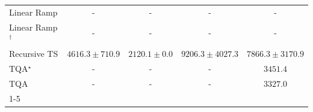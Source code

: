\begin{tabular}{l|cccc|}
Linear Ramp & {\cellcolor[HTML]{000000}} \color[HTML]{F1F1F1} {\cellcolor{white}} \color{black} - & {\cellcolor[HTML]{000000}} \color[HTML]{F1F1F1} {\cellcolor{white}} \color{black} - & {\cellcolor[HTML]{000000}} \color[HTML]{F1F1F1} {\cellcolor{white}} \color{black} - & {\cellcolor[HTML]{000000}} \color[HTML]{F1F1F1} {\cellcolor{white}} \color{black} - \\
Linear Ramp$^\dagger$ & {\cellcolor[HTML]{000000}} \color[HTML]{F1F1F1} {\cellcolor{white}} \color{black} - & {\cellcolor[HTML]{000000}} \color[HTML]{F1F1F1} {\cellcolor{white}} \color{black} - & {\cellcolor[HTML]{000000}} \color[HTML]{F1F1F1} {\cellcolor{white}} \color{black} - & {\cellcolor[HTML]{000000}} \color[HTML]{F1F1F1} {\cellcolor{white}} \color{black} - \\
Recursive TS & {\cellcolor[HTML]{9EBAD9}} \color[HTML]{000000} $4616.3\pm 710.9$ & {\cellcolor[HTML]{F5EEF6}} \color[HTML]{000000} $2120.1\pm 0.0$ & {\cellcolor[HTML]{023858}} \color[HTML]{F1F1F1} $9206.3\pm 4027.3$ & {\cellcolor[HTML]{04639B}} \color[HTML]{F1F1F1} $7866.3\pm 3170.9$ \\
TQA$^\star$ & {\cellcolor[HTML]{000000}} \color[HTML]{F1F1F1} {\cellcolor{white}} \color{black} - & {\cellcolor[HTML]{000000}} \color[HTML]{F1F1F1} {\cellcolor{white}} \color{black} - & {\cellcolor[HTML]{000000}} \color[HTML]{F1F1F1} {\cellcolor{white}} \color{black} - & {\cellcolor[HTML]{D2D2E7}} \color[HTML]{000000} $3451.4$ \\
TQA & {\cellcolor[HTML]{000000}} \color[HTML]{F1F1F1} {\cellcolor{white}} \color{black} - & {\cellcolor[HTML]{000000}} \color[HTML]{F1F1F1} {\cellcolor{white}} \color{black} - & {\cellcolor[HTML]{000000}} \color[HTML]{F1F1F1} {\cellcolor{white}} \color{black} - & {\cellcolor[HTML]{D5D5E8}} \color[HTML]{000000} $3327.0$ \\
\cline{1-5}
\bottomrule
\end{tabular}
